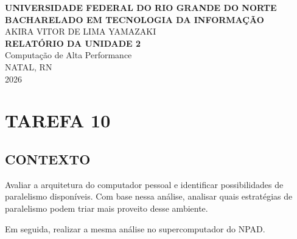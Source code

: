 \documentclass[12pt, openright, oneside, a4paper, brazil]{article}
\newcommand{\subtUm}{CONTEXTO}
\begin{document}
	
	\begin{center}
		\thispagestyle{empty}
		\textbf{\uppercase{Universidade Federal do Rio Grande do Norte}}\\
		\textbf{\uppercase{Bacharelado em Tecnologia da Informação}}\\
		\vspace{4cm}
		AKIRA VITOR DE LIMA YAMAZAKI\\
		\vspace{5cm}
		\textbf{RELATÓRIO DA UNIDADE 2}\\
		Computação de Alta Performance\\
		\vspace{11cm}
		NATAL, RN\\
		2026\\
	\end{center}
	
	\newpage
	\onehalfspacing
	\section{TAREFA 10}
	\subsection{\subtUm}
	\par{Avaliar a arquitetura do computador pessoal e identificar possibilidades de paralelismo disponíveis. Com base nessa análise, analisar quais estratégias de paralelismo podem triar mais proveito desse ambiente.
		
		Em seguida, realizar a mesma análise no supercomputador do NPAD.}
\end{document}

